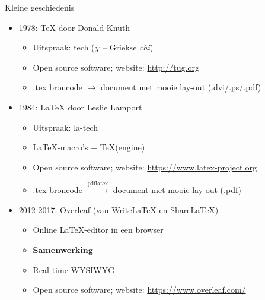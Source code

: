 \documentclass{beamer}
\begin{document}
\begin{frame}{Kleine geschiedenis}
\begin{itemize}
\item 1978: \alert{\TeX} door Donald Knuth
 \begin{itemize}
  \item Uitspraak: tech ($\chi$ -- Griekse \textit{chi})
  \item Open source software; website: \url{http://tug.org}
  \item .tex broncode $\rightarrow$ document met mooie lay-out (.dvi/.ps/.pdf) %
 \end{itemize}\pause
\item 1984: \alert{\LaTeX} door Leslie Lamport
 \begin{itemize}
  \item Uitspraak: la-tech
  \item \LaTeX-macro's + \TeX (engine)%
  \item Open source software; website: \url{https://www.latex-project.org}
  \item .tex broncode $\xrightarrow{\text{pdflatex}}$ document met mooie lay-out (.pdf)
 \end{itemize}\pause
\item 2012-2017: Overleaf (van WriteLaTeX en ShareLaTeX)
 \begin{itemize}
  \item Online \LaTeX-editor in een browser
  \item \textbf{Samenwerking}
  \item Real-time WYSIWYG
  \item Open source software; website: \url{https://www.overleaf.com/}
 \end{itemize}
\end{itemize}

\end{frame}

\end{document}
